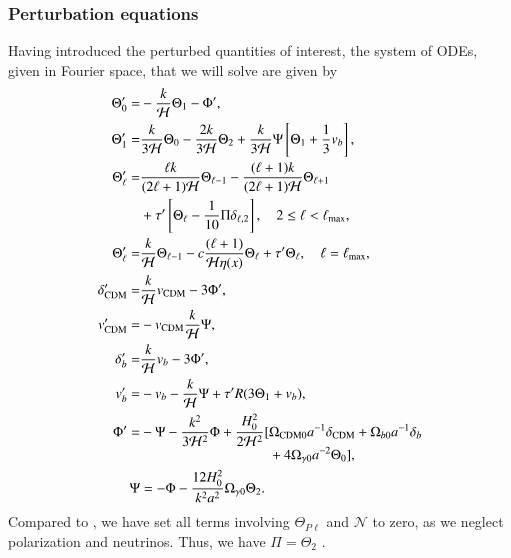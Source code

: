 \subsubsection{Perturbation equations}
Having introduced the perturbed quantities of interest, the system of ODEs, given in Fourier space, that we will solve are given by \cite[Eq. (22)]{callin} 
\begin{subequations} \label{eq:M3:theory:perturbation_ODEs}
    \begin{align}
        \Theta_0' =& - \frac{k}{\mathcal{H}}\Theta_1 - \Phi', \label{eq:M3:theory:perturbation_ODEs_Theta0}\\
        \Theta_1' =& \frac{k}{3\mathcal{H}}\Theta_0 - \frac{2k}{3\mathcal{H}}\Theta_2 + \frac{k}{3\mathcal{H}}\Psi \left[ \Theta_1 + \frac{1}{3}v_b \right], \label{eq:M3:theory:perturbation_ODEs_Theta1} \\ 
        \Theta_\ell' =& \frac{\ell k}{(2\ell+1)\mathcal{H}}\Theta_{\ell-1} - \frac{(\ell+1)k}{(2\ell+1)\mathcal{H}}\Theta_{\ell+1} \nonumber \\
        & + \tau'\left[ \Theta_\ell - \frac{1}{10}\Pi \delta_{\ell,2} \right],\quad 2\leq\ell<\ell_\mathrm{max}, \label{eq:M3:theory:perturbation_ODEs_Theta_ell} \\
        \Theta_\ell' =& \frac{k}{\mathcal{H}}\Theta_{\ell-1} - c \frac{(\ell+1)}{\mathcal{H}\eta(x)}\Theta_{\ell} + \tau' \Theta_\ell,\quad \ell=\ell_\mathrm{max}, \label{eq:M3:theory:perturbation_ODEs_Theta_ell_max} \\
        \delta_\mathrm{CDM}' =& \frac{k}{\mathcal{H}} v_\mathrm{CDM} - 3\Phi', \label{eq:M3:theory:perturbation_ODEs_delta_cdm} \\
        v_\mathrm{CDM}' =& - v_\mathrm{CDM} \frac{k}{\mathcal{H}} \Psi, \label{eq:M3:theory:perturbation_ODEs_v_cdm} \\
        \delta_b' =& \frac{k}{\mathcal{H}} v_b - 3\Phi', \label{eq:M3:theory:perturbation_ODEs_delta_b} \\
        v_b' =& -v_b - \frac{k}{\mathcal{H}} \Psi + \tau' R(3\Theta_1 + v_b), \label{eq:M3:theory:perturbation_ODEs_v_b} \\
        \Phi' =& -\Psi - \frac{k^2}{3\mathcal{H}^2}\Phi + \frac{H_0^2}{2\mathcal{H}^2} \begin{aligned}[t]
            [&\Omega_\mathrm{CDM0} a^{-1}\delta_\mathrm{CDM} + \Omega_{b0} a^{-1} \delta_b \\
            &+4\Omega_{\gamma 0} a^{-2} \Theta_0], 
            \end{aligned} \label{eq:M3:theory:perturbation_ODEs_Phi} \\
        \Psi &= -\Phi - \frac{12H_0^2}{k^2 a^2} \Omega_{\gamma 0} \Theta_2. \label{eq:M3:theory:perturbation_ODEs_Psi}
    \end{align}
\end{subequations}
Compared to \cite[Eq. (22)]{callin}, we have set all terms involving $\Theta_{P\ell}$ and $\mathcal{N}$ to zero, as we neglect polarization and neutrinos. Thus, we have $\Pi=\Theta_2$ . 

